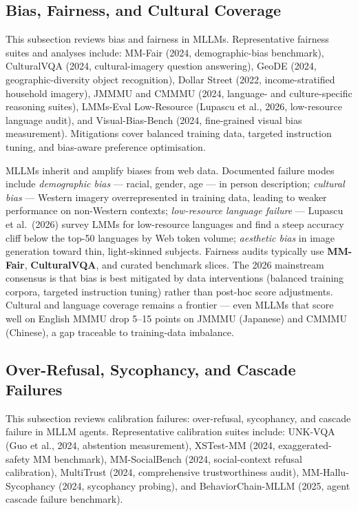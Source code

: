 \documentclass{article}
\begin{document}
\subsection{Bias, Fairness, and Cultural Coverage}\label{bias-fairness-and-cultural-coverage}

This subsection reviews bias and fairness in MLLMs. Representative fairness suites and analyses include: MM-Fair (2024, demographic-bias benchmark), CulturalVQA (2024, cultural-imagery question answering), GeoDE (2024, geographic-diversity object recognition), Dollar Street (2022, income-stratified household imagery), JMMMU and CMMMU (2024, language- and culture-specific reasoning suites), LMMs-Eval Low-Resource (Lupascu et al., 2026, low-resource language audit), and Visual-Bias-Bench (2024, fine-grained visual bias measurement). Mitigations cover balanced training data, targeted instruction tuning, and bias-aware preference optimisation.

MLLMs inherit and amplify biases from web data. Documented failure modes include \emph{demographic bias} --- racial, gender, age --- in person description; \emph{cultural bias} --- Western imagery overrepresented in training data, leading to weaker performance on non-Western contexts; \emph{low-resource language failure} --- Lupascu et al.~(2026) survey LMMs for low-resource languages and find a steep accuracy cliff below the top-50 languages by Web token volume; \emph{aesthetic bias} in image generation toward thin, light-skinned subjects. Fairness audits typically use \textbf{MM-Fair}, \textbf{CulturalVQA}, and curated benchmark slices. The 2026 mainstream consensus is that bias is best mitigated by data interventions (balanced training corpora, targeted instruction tuning) rather than post-hoc score adjustments. Cultural and language coverage remains a frontier --- even MLLMs that score well on English MMMU drop 5--15 points on JMMMU (Japanese) and CMMMU (Chinese), a gap traceable to training-data imbalance.

\subsection{Over-Refusal, Sycophancy, and Cascade Failures}\label{over-refusal-sycophancy-and-cascade-failures}

This subsection reviews calibration failures: over-refusal, sycophancy, and cascade failure in MLLM agents. Representative calibration suites include: UNK-VQA (Guo et al., 2024, abstention measurement), XSTest-MM (2024, exaggerated-safety MM benchmark), MM-SocialBench (2024, social-context refusal calibration), MultiTrust (2024, comprehensive trustworthiness audit), MM-Hallu-Sycophancy (2024, sycophancy probing), and BehaviorChain-MLLM (2025, agent cascade failure benchmark).
\end{document}
